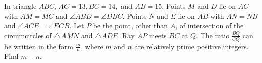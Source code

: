In triangle $ ABC$, $ AC = 13, BC = 14,$ and $ AB=15$.  Points $ M$ and $ D$ lie on $ AC$ with $ AM=MC$ and $ \angle ABD = \angle DBC$.  Points $ N$ and $ E$ lie on $ AB$ with $ AN=NB$ and $ \angle ACE = \angle ECB$.  Let $ P$ be the point, other than $ A$, of intersection of the circumcircles of $ \triangle AMN$ and $ \triangle ADE$.  Ray $ AP$ meets $ BC$ at $ Q$.  The ratio $ \frac{BQ}{CQ}$ can be written in the form $ \frac{m}{n}$, where $ m$ and $ n$ are relatively prime positive integers.  Find $ m-n$.